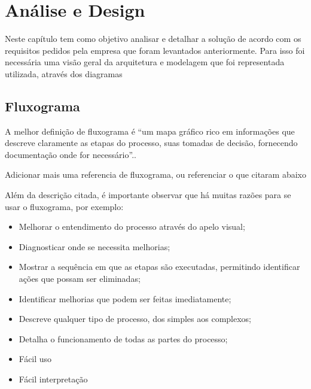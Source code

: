 \chapter{Análise e Design}

Neste capítulo tem como objetivo analisar e detalhar a solução de acordo com os requisitos pedidos pela empresa que foram  levantados anteriormente. Para isso foi necessária uma visão geral da arquitetura e modelagem que foi representada  utilizada, através dos diagramas
\newpage
\section{Fluxograma}

A melhor definição de fluxograma é “um mapa gráfico rico em informações que descreve claramente as etapas do processo, suas tomadas de decisão, fornecendo documentação onde for necessário”.\cite{Gradus2019}.

{\color{red} Adicionar mais uma referencia de fluxograma, ou referenciar o que citaram abaixo} 

Além da descrição citada, é importante observar que há muitas razões para se usar o fluxograma, por exemplo:
\begin{itemize}
	\item Melhorar o entendimento do processo através do apelo visual;
	\item Diagnosticar onde se necessita melhorias;
	\item Mostrar a sequência em que as etapas são executadas, permitindo identificar ações que possam ser eliminadas;
	\item Identificar melhorias que podem ser feitas imediatamente;
	\item Descreve qualquer tipo de processo, dos simples aos complexos;
	\item Detalha o funcionamento de todas as partes do processo;
	\item Fácil uso
	\item Fácil interpretação
\end{itemize}
\newpage


